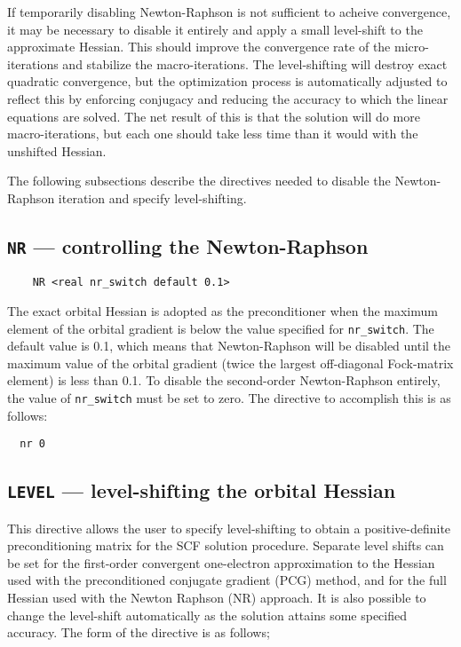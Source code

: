If temporarily disabling Newton-Raphson is not sufficient to acheive
convergence, it may be necessary to disable it entirely and apply a
small level-shift to the approximate Hessian.  This should improve the
convergence rate of the micro-iterations and stabilize the
macro-iterations.  The level-shifting will destroy exact quadratic
convergence, but the optimization process is automatically adjusted to
reflect this by enforcing conjugacy and reducing the accuracy to which
the linear equations are solved.  The net result of this is that the
solution will do more macro-iterations, but each one should take less
time than it would with the unshifted Hessian.

The following subsections describe the directives needed to disable the
Newton-Raphson iteration and specify level-shifting.


\subsection{{\tt NR} --- controlling the Newton-Raphson}
\label{sec:nrswitch}

\begin{verbatim}
    NR <real nr_switch default 0.1>
\end{verbatim}

The exact orbital Hessian is adopted as the preconditioner when the
maximum element of the orbital gradient is below the value specified
for \verb+nr_switch+.  The default value is 0.1, which means that
Newton-Raphson will be disabled until the maximum value of the orbital
gradient (twice the largest off-diagonal Fock-matrix element) is less
than 0.1.   To disable the second-order Newton-Raphson entirely, the
value of \verb+nr_switch+ must be set to zero.  The directive to accomplish
this is as follows:
\begin{verbatim}
  nr 0
\end{verbatim}

\subsection{{\tt LEVEL} --- level-shifting the orbital Hessian}
\label{sec:level}

This directive allows the user to specify level-shifting to obtain a
positive-definite preconditioning matrix for the SCF solution
procedure.  Separate level shifts can be set for the first-order
convergent one-electron approximation to the Hessian used with the
preconditioned conjugate gradient (PCG) method, and for the full
Hessian used with the Newton Raphson (NR) approach.  It is also
possible to change the level-shift automatically as the solution
attains some specified accuracy.  The form of the directive is as
follows;

